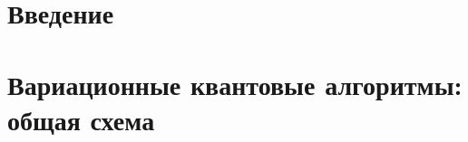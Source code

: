 \documentclass[a4paper]{report}
\begin{document}
\setcounter{page}{2}

\tableofcontents
\newpage



\chapter*{Введение}


\chapter{Вариационные квантовые алгоритмы: общая схема}

\end{document}
